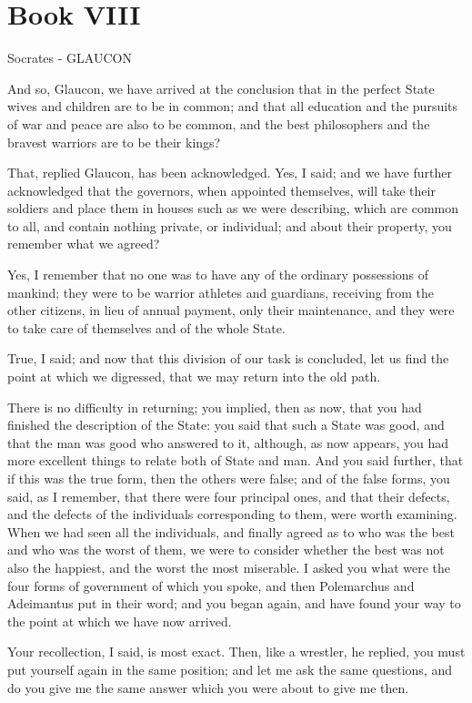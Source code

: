 \chapter{Book VIII}

Socrates - GLAUCON

And so, Glaucon, we have arrived at the conclusion that in the perfect State wives and children are to be in common; and that all education and the pursuits of war and peace are also to be common, and the best philosophers and the bravest warriors are to be their kings?

That, replied Glaucon, has been acknowledged.
Yes, I said; and we have further acknowledged that the governors, when appointed themselves, will take their soldiers and place them in houses such as we were describing, which are common to all, and contain nothing private, or individual; and about their property, you remember what we agreed?

Yes, I remember that no one was to have any of the ordinary possessions of mankind; they were to be warrior athletes and guardians, receiving from the other citizens, in lieu of annual payment, only their maintenance, and they were to take care of themselves and of the whole State.

True, I said; and now that this division of our task is concluded, let us find the point at which we digressed, that we may return into the old path.

There is no difficulty in returning; you implied, then as now, that you had finished the description of the State: you said that such a State was good, and that the man was good who answered to it, although, as now appears, you had more excellent things to relate both of State and man. And you said further, that if this was the true form, then the others were false; and of the false forms, you said, as I remember, that there were four principal ones, and that their defects, and the defects of the individuals corresponding to them, were worth examining. When we had seen all the individuals, and finally agreed as to who was the best and who was the worst of them, we were to consider whether the best was not also the happiest, and the worst the most miserable. I asked you what were the four forms of government of which you spoke, and then Polemarchus and Adeimantus put in their word; and you began again, and have found your way to the point at which we have now arrived.

Your recollection, I said, is most exact.
Then, like a wrestler, he replied, you must put yourself again in the same position; and let me ask the same questions, and do you give me the same answer which you were about to give me then.

